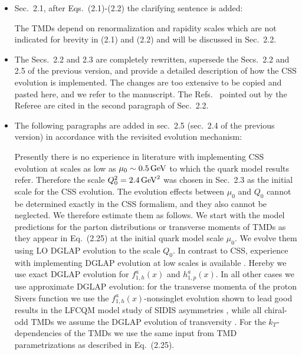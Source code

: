 \documentclass[a4paper]{article}
\newcommand{\comment}[1]{{\color{blue}#1}}
\begin{document}
\begin{itemize}
\item\comment{
Sec.~2.1, after Eqs.~(2.1)-(2.2) the clarifying sentence is added:}

The TMDs depend on renormalization and rapidity scales which are not
indicated for brevity in (2.1) and (2.2) and will be discussed in Sec.~2.2.


\item\comment{
The Secs.~2.2 and 2.3 are completely rewritten,
supersede the Secs.~2.2 and 2.5 of the previous version, and provide a detailed
description of how the CSS evolution is implemented. The changes are too
extensive to be copied and pasted here, and we refer to the manuscript. 
The Refs.~\cite{Collins:1981va,Aybat:2011zv,Angeles-Martinez:2015sea,
Scimemi:2019cmh,Bacchetta:2019sam,Ebert:2020dfc} pointed out by the 
Referee are cited in the second paragraph of Sec.~2.2.}


\item\comment{The following paragraphs are added in sec.~2.5 (sec.~2.4 of the previous version) in accordance with the revisited evolution mechanism:}

{Presently there is no experience in literature with implementing
CSS evolution at scales as low as $\mu_0\sim 0.5\,{\rm GeV}$
to which the quark model results refer. Therefore the scale
$Q_0^2 = 2.4\,{\rm GeV}^2$ was chosen in Sec.~2.3 
as the initial scale for the CSS evolution.
The evolution effects between $\mu_0$ and $Q_0$ cannot be determined 
exactly in the CSS formalism, and they also cannot be neglected. 
We therefore estimate them as follows.  
We start with the model predictions for the parton
distributions or transverse moments of TMDs as they 
appear in Eq.~(2.25) at the initial quark model 
scale $\mu_0$. We evolve them using LO DGLAP evolution to 
the scale $Q_0$. In contrast to CSS, experience with 
implementing DGLAP evolution at low scales is available \cite{Gluck:1991ng,Gluck:1991ey,Gluck:1994uf,Gluck:1998xa,Gluck:1999xe}. 
Hereby we use exact DGLAP evolution for $f_{1,h}^a(x)$ and $h_{1,p}^a(x)$.
In all other cases we use approximate DGLAP evolution: for the transverse
momenta of the proton Sivers function we use the $f_{1,h}^a(x)$-nonsinglet 
evolution shown to lead good results in the LFCQM model study of SIDIS 
asymmetries \cite{Pasquini:2011tk}, while all chiral-odd TMDs we assume 
the DGLAP evolution of transversity \cite{Hirai:1997mm,Boffi:2009sh}.
For the $k_T$-dependencies of the TMDs we use the same
input from TMD parametrizations as described in Eq.~(2.25).

}
\end{itemize}
\end{document}

